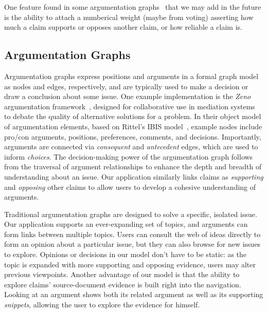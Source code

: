 \documentclass{chi2009}
\begin{document}
One feature found in some argumentation graphs~\cite{Korb97acognitive} that we may add in the future is the ability to attach a numberical weight (maybe from voting) asserting how much a claim supports or opposes another claim, or how reliable a claim is.


%

\subsection{Argumentation Graphs}
Argumentation graphs express positions and arguments in a formal graph model as nodes and edges, respectively, and are typically used to make a decision or draw a conclusion about some issue. One example implementation is the {\it Zeno} argumentation framework~\cite{zeno}, designed for collaborative use in mediation systems to debate the quality of alternative solutions for a problem. In their object model of argumentation elements, based on Rittel's IBIS model~\cite{ibis}, example nodes include pro/con arguments, positions, preferences, comments, and decisions. Importantly, arguments are connected via {\it consequent} and {\it antecedent} edges, which are used to inform {\it choices}. The decision-making power of the argumentation graph follows from the traversal of argument relationships to enhance the depth and breadth of understanding about an issue. Our application similarly links claims as {\it supporting} and {\it opposing} other claims to allow users to develop a cohesive understanding of arguments.

Traditional argumentation graphs are designed to solve a specific, isolated issue. Our application supports an ever-expanding set of topics, and arguments can form links between multiple topics. Users can consult the web of ideas directly to form an opinion about a particular issue, but they can also browse for new issues to explore. Opinions or decisions in our model don't have to be static: as the topic is expanded with more supporting and opposing evidence, users may alter previous viewpoints. Another advantage of our model is that the ability to explore claims' source-document evidence is built right into the navigation. Looking at an argument shows both its related argument as well as its supporting {\it snippets}, allowing the user to explore the evidence for himself. 
\end{document}
